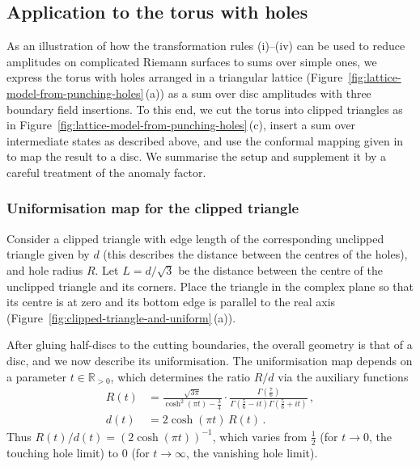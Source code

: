 \documentclass[11pt,a4paper]{article}
\numberwithin{equation}{section}
\begin{document}
 \subsection{Application to the torus with holes}

As an illustration of how the transformation rules (i)--(iv) can be used to reduce amplitudes on complicated Riemann surfaces to sums over simple ones, we express the torus with holes arranged in a triangular lattice (Figure~\ref{fig:lattice-model-from-punching-holes}\,(a)) as a sum over disc amplitudes with three boundary field insertions. To this end, we cut the torus into clipped triangles as in Figure~\ref{fig:lattice-model-from-punching-holes}\,(c), insert a sum over intermediate states as described above, and use the conformal mapping given in \cite[Sec.\,6]{Brehm:2021wev} to map the result to a disc. We summarise the setup and supplement it by a careful treatment of the anomaly factor.

\subsubsection{Uniformisation map for the clipped triangle}

Consider a clipped triangle with edge length of the corresponding unclipped triangle given by $d$ (this describes the distance between the centres of the holes), and hole radius $R$. Let $L = d/\sqrt{3}$ be the distance between the centre of the unclipped triangle and its corners. Place the triangle in the complex plane so that its centre is at zero and its bottom edge is parallel to the real axis (Figure~\ref{fig:clipped-triangle-and-uniform}\,(a)). 

After gluing half-discs to the cutting boundaries, the overall geometry is that of a disc, and we now describe its uniformisation. 
The uniformisation map depends on a parameter $t \in \mathbb{R}_{>0}$, which determines the ratio $R/d$ via the auxiliary functions
\begin{align}
    R(t) &= 
    \frac{\sqrt{3\pi}}{\cosh^2(\pi t)-\frac{3}{4}} \cdot
    \frac{\Gamma\!\left(\frac{7}{6}\right)}{\Gamma\!\left(\frac{5}{6}-i t\right)\Gamma\!\left(\frac{5}{6}+i t\right)}\,,
\nonumber
    \\
    d(t) &= 2\cosh(\pi t) \, R(t)\,. 
\label{eq:d(t)R(t)}
\end{align}
Thus $R(t)/d(t) = (2 \cosh(\pi t))^{-1}$, which varies from $\frac12$ (for $t\to 0$, the touching hole limit) to $0$ (for $t \to \infty$, the vanishing hole limit).
\end{document}
